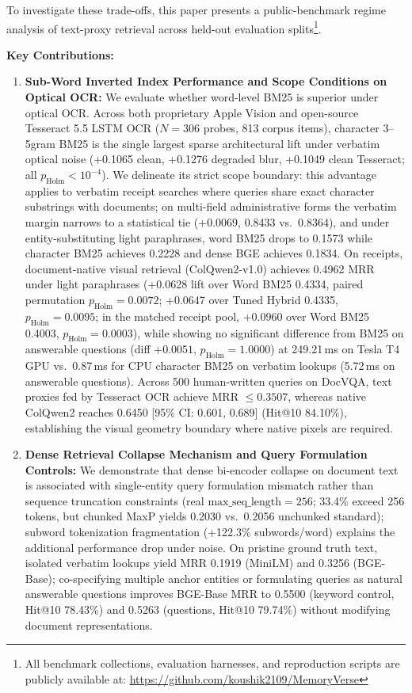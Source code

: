 \documentclass[conference]{IEEEtran}
\begin{document}
To investigate these trade-offs, this paper presents a public-benchmark regime analysis of text-proxy retrieval across held-out evaluation splits\footnote{All benchmark collections, evaluation harnesses, and reproduction scripts are publicly available at: \url{https://github.com/koushik2109/MemoryVerse}}.

\textbf{Key Contributions:}
\begin{enumerate}
    \setlength{\itemsep}{1pt plus 0.5pt}
    \setlength{\parskip}{0pt}
    \item \textbf{Sub-Word Inverted Index Performance and Scope Conditions on Optical OCR:} We evaluate whether word-level BM25 is superior under optical OCR. Across both proprietary Apple Vision and open-source Tesseract 5.5 LSTM OCR ($N=306$ probes, 813 corpus items), character 3--5gram BM25 is the single largest sparse architectural lift under verbatim optical noise (+0.1065 clean, +0.1276 degraded blur, +0.1049 clean Tesseract; all $p_{\text{Holm}} < 10^{-4}$). We delineate its strict scope boundary: this advantage applies to verbatim receipt searches where queries share exact character substrings with documents; on multi-field administrative forms the verbatim margin narrows to a statistical tie (+0.0069, 0.8433 vs.\ 0.8364), and under entity-substituting light paraphrases, word BM25 drops to 0.1573 while character BM25 achieves 0.2228 and dense BGE achieves 0.1834. On receipts, document-native visual retrieval (ColQwen2-v1.0) achieves 0.4962 MRR under light paraphrases (+0.0628 lift over Word BM25 0.4334, paired permutation $p_{\text{Holm}} = 0.0072$; +0.0647 over Tuned Hybrid 0.4335, $p_{\text{Holm}} = 0.0095$; in the matched receipt pool, +0.0960 over Word BM25 0.4003, $p_{\text{Holm}} = 0.0003$), while showing no significant difference from BM25 on answerable questions (diff $+0.0051$, $p_{\text{Holm}} = 1.0000$) at 249.21\,ms on Tesla T4 GPU vs.\ 0.87\,ms for CPU character BM25 on verbatim lookups (5.72\,ms on answerable questions). Across 500 human-written queries on DocVQA, text proxies fed by Tesseract OCR achieve MRR $\le 0.3507$, whereas native ColQwen2 reaches 0.6450 [95\% CI: 0.601, 0.689] (Hit@10 84.10\%), establishing the visual geometry boundary where native pixels are required.
    \item \textbf{Dense Retrieval Collapse Mechanism and Query Formulation Controls:} We demonstrate that dense bi-encoder collapse on document text is associated with single-entity query formulation mismatch rather than sequence truncation constraints (real $\text{max\_seq\_length}=256$; 33.4\% exceed 256 tokens, but chunked MaxP yields 0.2030 vs.\ 0.2056 unchunked standard); subword tokenization fragmentation (+122.3\% subwords/word) explains the additional performance drop under noise. On pristine ground truth text, isolated verbatim lookups yield MRR 0.1919 (MiniLM) and 0.3256 (BGE-Base); co-specifying multiple anchor entities or formulating queries as natural answerable questions improves BGE-Base MRR to 0.5500 (keyword control, Hit@10 78.43\%) and 0.5263 (questions, Hit@10 79.74\%) without modifying document representations.

\end{enumerate}
\end{document}
